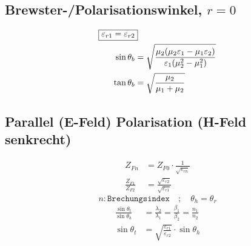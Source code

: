 
\subsection{Brewster-/Polarisationswinkel, $r=0$}
\begin{align*}
    \Aboxed{\varepsilon_{r1}=\varepsilon_{r2}}                                                                    \\
    \sin\theta_b & = \sqrt{\frac{\mu_2(\mu_2\varepsilon_1 - \mu_1\varepsilon_2)}{\varepsilon_1(\mu_2^2-\mu_1^2)}} \\
    \tan\theta_b & = \sqrt{\frac{\mu_2}{\mu_1+\mu_2}}
\end{align*}

\vspace{10ex}
\subsection{Parallel (E-Feld) Polarisation (H-Feld senkrecht)}


\begin{align*}
    Z_{Fn}                & = Z_{F0}\cdot\frac{1}{\sqrt{\varepsilon_{rn}}}            \\
    \frac{Z_{F1}}{Z_{F2}} & = \frac{\sqrt{\varepsilon_{r2}}}{\sqrt{\varepsilon_{r1}}}
\end{align*}
\[ n: \texttt{Brechungsindex} \quad ; \quad \theta_h = \theta_r\]
\begin{align*}
    \frac{\sin\theta_t}{\sin\theta_h} & = \frac{\lambda_2}{\lambda_1}= \frac{\beta_1}{\beta_2}= \frac{n_1}{n_2} \\
    \sin\theta_t                      & = \sqrt{\frac{\varepsilon_{r1}}{\varepsilon_{r2}}}\cdot\sin\theta_h
\end{align*}

